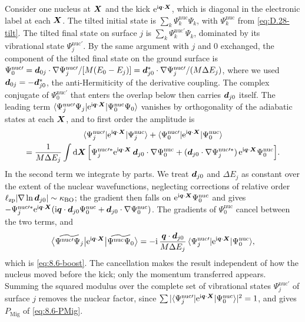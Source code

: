 Consider one nucleus at $\bm{X}$ and the kick $\mathrm{e}^{\mathrm{i}\bm{q}\cdot\bm{X}}$, which is diagonal in the electronic label at each $\bm{X}$. The tilted initial state is $\sum_k\Psi^{\mathrm{nuc}}_k\Psi_k$, with $\Psi^{\mathrm{nuc}}_k$ from \cref{eq:D.28-tilt}. The tilted final state on surface $j$ is $\sum_k\Psi^{\mathrm{nuc}\prime}_k\Psi_k$, dominated by its vibrational state $\Psi^{\mathrm{nuc}\prime}_j$. By the same argument with $j$ and 0 exchanged, the component of the tilted final state on the ground surface is $\Psi^{\mathrm{nuc}\prime}_0 = \bm{d}_{0j}\cdot\nabla\Psi^{\mathrm{nuc}\prime}_j/[M(E_0 - E_j)] = \bm{d}_{j0}^*\cdot\nabla\Psi^{\mathrm{nuc}\prime}_j/(M\Delta E_j)$, where we used $\bm{d}_{0j} = -\bm{d}_{j0}^*$, the anti-Hermiticity of the derivative coupling. The complex conjugate of $\Psi^{\mathrm{nuc}\prime}_0$ that enters the overlap below then carries $\bm{d}_{j0}$ itself. The leading term $\langle\Psi^{\mathrm{nuc}\prime}_j\Psi_j|\mathrm{e}^{\mathrm{i}\bm{q}\cdot\bm{X}}|\Psi^{\mathrm{nuc}}_0\Psi_0\rangle$ vanishes by orthogonality of the adiabatic states at each $\bm{X}$, and to first order the amplitude is
\begin{multline*}
  \langle\Psi^{\mathrm{nuc}\prime}_j|\mathrm{e}^{\mathrm{i}\bm{q}\cdot\bm{X}}|\Psi^{\mathrm{nuc}}_j\rangle + \langle\Psi^{\mathrm{nuc}\prime}_0|\mathrm{e}^{\mathrm{i}\bm{q}\cdot\bm{X}}|\Psi^{\mathrm{nuc}}_0\rangle\\
  = \frac{1}{M\Delta E_j}\int\mathrm{d}\bm{X}\,\Bigl[\Psi^{\mathrm{nuc}\prime*}_j\mathrm{e}^{\mathrm{i}\bm{q}\cdot\bm{X}}\,\bm{d}_{j0}\cdot\nabla\Psi^{\mathrm{nuc}}_0 + (\bm{d}_{j0}\cdot\nabla\Psi^{\mathrm{nuc}\prime*}_j)\,\mathrm{e}^{\mathrm{i}\bm{q}\cdot\bm{X}}\Psi^{\mathrm{nuc}}_0\Bigr] .
\end{multline*}
In the second term we integrate by parts. We treat $\bm{d}_{j0}$ and $\Delta E_j$ as constant over the extent of the nuclear wavefunctions, neglecting corrections of relative order $\ell_{\mathrm{zp}}|\nabla\ln\bm{d}_{j0}| \sim \kappa_{\mathrm{BO}}$; the gradient then falls on $\mathrm{e}^{\mathrm{i}\bm{q}\cdot\bm{X}}\Psi^{\mathrm{nuc}}_0$ and gives $-\Psi^{\mathrm{nuc}\prime*}_j\mathrm{e}^{\mathrm{i}\bm{q}\cdot\bm{X}}(\mathrm{i}\bm{q}\cdot\bm{d}_{j0}\Psi^{\mathrm{nuc}}_0 + \bm{d}_{j0}\cdot\nabla\Psi^{\mathrm{nuc}}_0)$. The gradients of $\Psi^{\mathrm{nuc}}_0$ cancel between the two terms, and
\begin{equation}
  \bigl\langle\widetilde{\Psi^{\mathrm{nuc}\prime}\Psi_j}\big|\mathrm{e}^{\mathrm{i}\bm{q}\cdot\bm{X}}\big|\widetilde{\Psi^{\mathrm{nuc}}\Psi_0}\bigr\rangle = -\mathrm{i}\,\frac{\bm{q}\cdot\bm{d}_{j0}}{M\Delta E_j}\,\langle\Psi^{\mathrm{nuc}\prime}_j|\mathrm{e}^{\mathrm{i}\bm{q}\cdot\bm{X}}|\Psi^{\mathrm{nuc}}_0\rangle ,
  \label{eq:D.28-boost}
\end{equation}
which is \cref{eq:8.6-boost}. The cancellation makes the result independent of how the nucleus moved before the kick; only the momentum transferred appears. Summing the squared modulus over the complete set of vibrational states $\Psi^{\mathrm{nuc}\prime}_j$ of surface $j$ removes the nuclear factor, since $\sum|\langle\Psi^{\mathrm{nuc}\prime}_j|\mathrm{e}^{\mathrm{i}\bm{q}\cdot\bm{X}}|\Psi^{\mathrm{nuc}}_0\rangle|^2 = 1$, and gives $P_{\mathrm{Mig}}$ of \cref{eq:8.6-PMig}.


